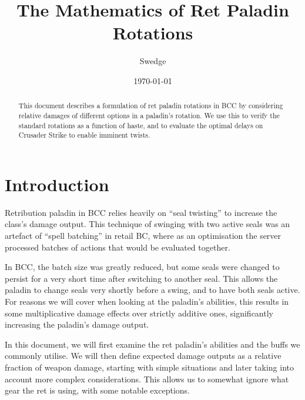 \documentclass[letterpaper,11pt]{article}
\begin{document}
	
	\title{The Mathematics of Ret Paladin Rotations}
	\author{Swedge}
	\date{\today}
	\maketitle
	
	\begin{abstract}
		This document describes a formulation of ret paladin rotations in BCC by considering relative damages of different options in a paladin's rotation.
		We use this to verify the standard rotations as a function of haste, and to evaluate the optimal delays on Crusader Strike to enable imminent twists.
	\end{abstract}
	
	\section{Introduction}
	
	Retribution paladin in BCC relies heavily on ``seal twisting'' to increase the class's damage output.
	This technique of swinging with two active seals was an artefact of ``spell batching'' in retail BC, where as an optimisation the server processed batches of actions that would be evaluated together.
	
	In BCC, the batch size was greatly reduced, but some seals were changed to persist for a very short time after switching to another seal.
	This allows the paladin to change seals very shortly before a swing, and to have both seals active. For reasons we will cover when looking at the paladin's abilities, this results in some multiplicative damage effects over strictly additive ones, significantly increasing the paladin's damage output.
	
	In this document, we will first examine the ret paladin's abilities and the buffs we commonly utilise.
	We will then define expected damage outputs as a relative fraction of weapon damage, starting with simple situations and later taking into account more complex considerations.
	This allows us to somewhat ignore what gear the ret is using, with some notable exceptions.
	
\end{document}
